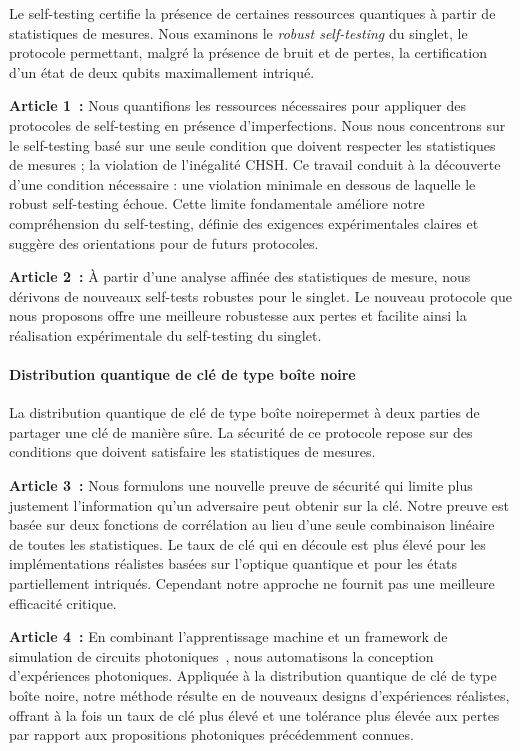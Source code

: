 Le self-testing certifie la présence de certaines ressources quantiques à partir de statistiques de mesures.
Nous examinons le \textit{robust self-testing} du singlet, le protocole permettant, malgré la présence de bruit et de pertes, la certification d'un état de deux qubits maximallement intriqué.

\medbreak

\textbf{Article 1~\cite{Valcarce2020}:} 
Nous quantifions les ressources nécessaires pour appliquer des protocoles de self-testing en présence d'imperfections.
Nous nous concentrons sur le self-testing basé sur une seule condition que doivent respecter les statistiques de mesures ; la violation de l'inégalité CHSH.
Ce travail conduit à la découverte d'une condition nécessaire : une violation minimale en dessous de laquelle le robust self-testing échoue.
Cette limite fondamentale améliore notre compréhension du self-testing, définie des exigences expérimentales claires et suggère des orientations pour de futurs protocoles.

\textbf{Article 2~\cite{Valcarce2022}:} 
À partir d'une analyse affinée des statistiques de mesure, nous dérivons de nouveaux self-tests robustes pour le singlet.
Le nouveau protocole que nous proposons offre une meilleure robustesse aux pertes et facilite ainsi la réalisation expérimentale du self-testing du singlet.

\paragraph{Distribution quantique de clé de type \guillemotleft boîte noire\guillemotright}

La distribution quantique de clé de type \guillemotleft boîte noire\guillemotright permet à deux parties de partager une clé de manière sûre.
La sécurité de ce protocole repose sur des conditions que doivent satisfaire les statistiques de mesures.

\medbreak

\textbf{Article 3~\cite{Sekatski2021}:}
Nous formulons une nouvelle preuve de sécurité qui limite plus justement l'information qu'un adversaire peut obtenir sur la clé.
Notre preuve est basée sur deux fonctions de corrélation au lieu d'une seule combinaison linéaire de toutes les statistiques.
Le taux de clé qui en découle est plus élevé pour les implémentations réalistes basées sur l'optique quantique et pour les états partiellement intriqués. 
Cependant notre approche ne fournit pas une meilleure efficacité critique.

\textbf{Article 4~\cite{Valcarce2022b}:} 
En combinant l'apprentissage machine et un framework de simulation de circuits photoniques~\cite{Valcarce2021}, nous automatisons la conception d'expériences photoniques.
Appliquée à la distribution quantique de clé de type \guillemotleft boîte noire\guillemotright, notre méthode résulte en de nouveaux designs d'expériences réalistes, offrant à la fois un taux de clé plus élevé et une tolérance plus élevée aux pertes par rapport aux propositions photoniques précédemment connues.


